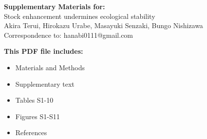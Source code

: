 \begin{center}
\LARGE{\textbf{Supplementary Materials for:}}\\[7.5mm]
\LARGE{Stock enhancement undermines ecological stability}\\[7.5mm]
\large{Akira Terui, Hirokazu Urabe, Masayuki Senzaki, Bungo Nishizawa}\\[7.5mm]
\large{Correspondence to: hanabi0111@gmail.com}\\[15mm]
\end{center}
\begin{flushleft}
\textbf{This PDF file includes:}
\begin{itemize}
\item Materials and Methods
\item Supplementary text
\item Tables S1-10
\item Figures S1-S11
\item References
\end{itemize}
\end{flushleft}

\newpage